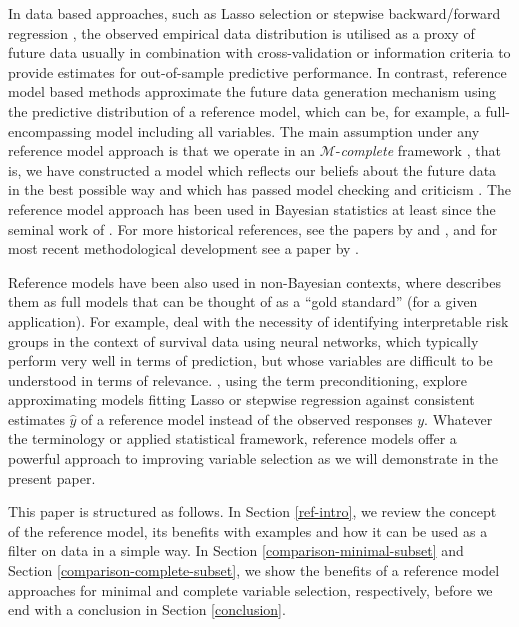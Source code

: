 \documentclass[a4]{article}
\theoremstyle{definition}
\begin{document}
In data based approaches, such as Lasso selection
\citep{tibshirani1996regression} or stepwise backward/forward
regression \citep{venables2013modern,harrell2015regression}, the
observed empirical data distribution is utilised as a proxy of future
data usually in combination with cross-validation or information
criteria to provide estimates for out-of-sample predictive
performance.  In contrast, reference model based methods approximate
the future data generation mechanism using the predictive distribution
of a reference model, which can be, for example, a full-encompassing
model including all variables.  The main assumption under any
reference model approach is that we operate in an
$\mathcal{M}$-\textit{complete} framework
\citep{book:bernardo_smith,vehtari2012survey}, that is, we have
constructed a model which reflects our beliefs about
the future data in the best possible way and which has passed model checking and criticism
\citep[see, e.g.][]{gelman2013bayesian,gabry2019visualization}.  The reference model approach
has been used in Bayesian statistics at least since the seminal
work of \citet{paper:reference_lindley}. For more historical
references, see the papers by \citet{vehtari2012survey} and
\citet{paper:model_selection}, and for most recent methodological
development see a paper by \citet{paper:projpred}.

Reference models have been also used in non-Bayesian contexts, where
\cite{harrell2015regression} describes them as full models that can be
thought of as a ``gold standard'' (for a given application).  For
example, \cite{faraggi2001understanding} deal with the necessity of
identifying interpretable risk groups in the context of survival data
using neural networks, which typically perform very well in terms of
prediction, but whose variables are difficult to be understood in
terms of relevance.  \cite{paul2008preconditioning}, using the term
preconditioning, explore approximating models fitting Lasso or
stepwise regression against consistent estimates $\hat{y}$ of a
reference model instead of the observed responses $y$.
Whatever the terminology or applied statistical framework, reference
models offer a powerful approach to improving variable selection as we
will demonstrate in the present paper.

This paper is structured as follows. In Section
\ref{ref-intro}, we review the concept of the reference
model, its benefits with examples and how it can be used as a filter
on data in a simple way. In Section \ref{comparison-minimal-subset} and 
Section \ref{comparison-complete-subset}, we show the
benefits of a reference model approaches for minimal and complete 
variable selection, respectively, before we end with a conclusion in Section \ref{conclusion}.
\end{document}
